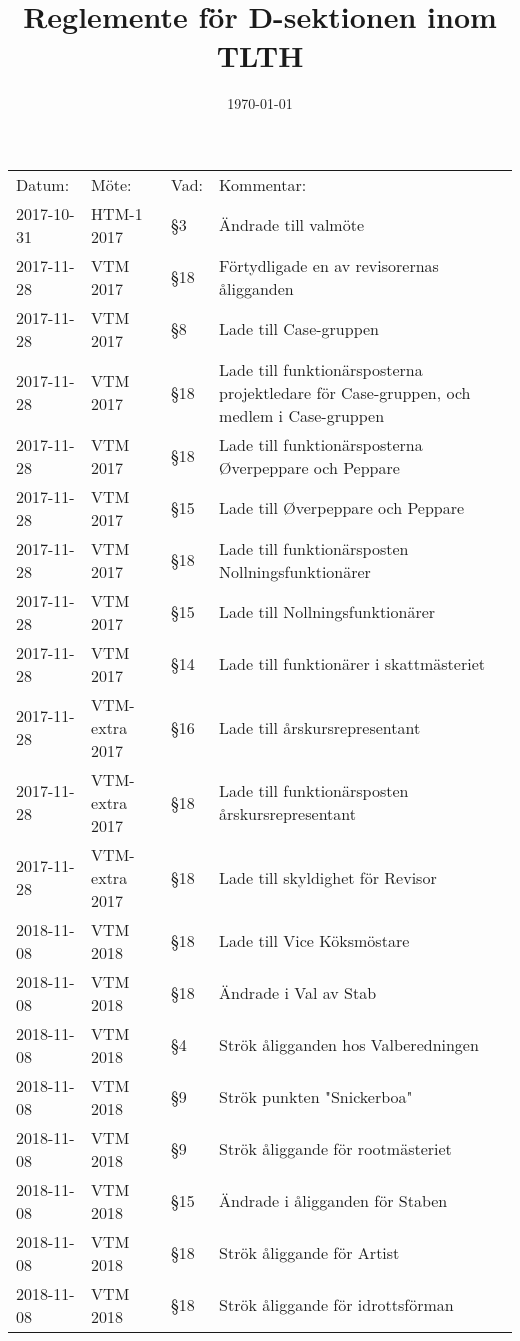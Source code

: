 \documentclass[pdfbookmarks,a4paper,11pt]{article}
\title{Reglemente för D-sektionen inom TLTH}
\date{\today}
\begin{document}
\maketitle



\begin{longtable}{lllp{9cm}}
	Datum: & Möte: & Vad: & Kommentar: \\
    2017-10-31 & HTM-1 2017 & \S3  & Ändrade till valmöte \\
    2017-11-28 & VTM 2017 & \S18 & Förtydligade en av revisorernas åligganden\\
    2017-11-28 & VTM 2017 & \S8 & Lade till Case-gruppen\\
    2017-11-28 & VTM 2017 & \S18 & Lade till funktionärsposterna projektledare för Case-gruppen, och medlem i Case-gruppen\\
    2017-11-28 & VTM 2017 & \S18 & Lade till funktionärsposterna \O verpeppare och Peppare\\
    2017-11-28 & VTM 2017 & \S15 & Lade till \O verpeppare och Peppare\\
    2017-11-28 & VTM 2017 & \S18 & Lade till funktionärsposten Nollningsfunktionärer\\
    2017-11-28 & VTM 2017 & \S15 & Lade till Nollningsfunktionärer\\
    2017-11-28 & VTM 2017 & \S14 & Lade till funktionärer i skattmästeriet\\
    2017-11-28 & VTM-extra 2017 & \S16 & Lade till årskursrepresentant\\
    2017-11-28 & VTM-extra 2017 & \S18 & Lade till funktionärsposten årskursrepresentant\\
	2017-11-28 & VTM-extra 2017 & \S18 & Lade till skyldighet för Revisor\\
	2018-11-08 & VTM 2018 & \S18 & Lade till Vice Köksmöstare\\
	2018-11-08 & VTM 2018 & \S18 & Ändrade i Val av Stab\\
	2018-11-08 & VTM 2018 & \S4 & Strök åligganden hos Valberedningen\\
	2018-11-08 & VTM 2018 & \S9 & Strök punkten "Snickerboa"\\
	2018-11-08 & VTM 2018 & \S9 & Strök åliggande för rootmästeriet\\
	2018-11-08 & VTM 2018 & \S15 & Ändrade i åligganden för Staben\\
	2018-11-08 & VTM 2018 & \S18 & Strök åliggande för Artist\\
	2018-11-08 & VTM 2018 & \S18 & Strök åliggande för idrottsförman\\

\end{longtable}
\end{document}
